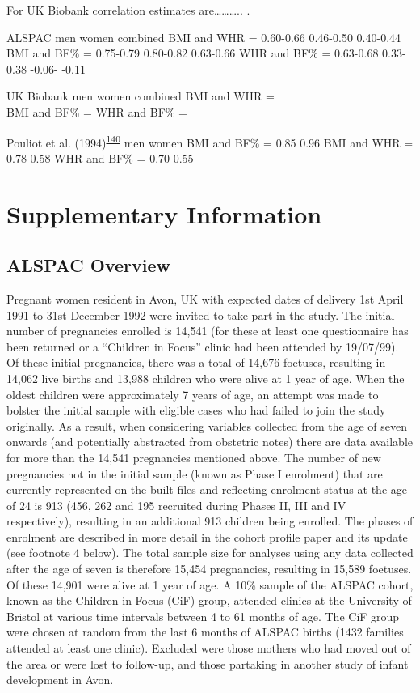 \documentclass[11pt,twoside]{bristolthesis}
\begin{document}
For UK Biobank correlation estimates are\ldots{}\ldots{}\ldots{}.. .

ALSPAC
men women combined
BMI and WHR = 0.60-0.66 0.46-0.50 0.40-0.44
BMI and BF\% = 0.75-0.79 0.80-0.82 0.63-0.66
WHR and BF\% = 0.63-0.68 0.33-0.38 -0.06- -0.11

UK Biobank
men women combined
BMI and WHR =\\
BMI and BF\% =
WHR and BF\% =

Pouliot et al. (1994)\textsuperscript{\protect\hyperlink{ref-Pouliot1994}{140}}
men women
BMI and BF\% = 0.85 0.96
BMI and WHR = 0.78 0.58
WHR and BF\% = 0.70 0.55

\hypertarget{supplementary-information}{%
\section{Supplementary Information}\label{supplementary-information}}

\hypertarget{supp-alspac}{%
\subsection{ALSPAC Overview}\label{supp-alspac}}

Pregnant women resident in Avon, UK with expected dates of delivery 1st April 1991 to 31st December 1992 were invited to take part in the study. The initial number of pregnancies enrolled is 14,541 (for these at least one questionnaire has been returned or a ``Children in Focus'' clinic had been attended by 19/07/99). Of these initial pregnancies, there was a total of 14,676 foetuses, resulting in 14,062 live births and 13,988 children who were alive at 1 year of age. When the oldest children were approximately 7 years of age, an attempt was made to bolster the initial sample with eligible cases who had failed to join the study originally. As a result, when considering variables collected from the age of seven onwards (and potentially abstracted from obstetric notes) there are data available for more than the 14,541 pregnancies mentioned above. The number of new pregnancies not in the initial sample (known as Phase I enrolment) that are currently represented on the built files and reflecting enrolment status at the age of 24 is 913 (456, 262 and 195 recruited during Phases II, III and IV respectively), resulting in an additional 913 children being enrolled. The phases of enrolment are described in more detail in the cohort profile paper and its update (see footnote 4 below). The total sample size for analyses using any data collected after the age of seven is therefore 15,454 pregnancies, resulting in 15,589 foetuses. Of these 14,901 were alive at 1 year of age. A 10\% sample of the ALSPAC cohort, known as the Children in Focus (CiF) group, attended clinics at the University of Bristol at various time intervals between 4 to 61 months of age. The CiF group were chosen at random from the last 6 months of ALSPAC births (1432 families attended at least one clinic). Excluded were those mothers who had moved out of the area or were lost to follow-up, and those partaking in another study of infant development in Avon.
\end{document}
